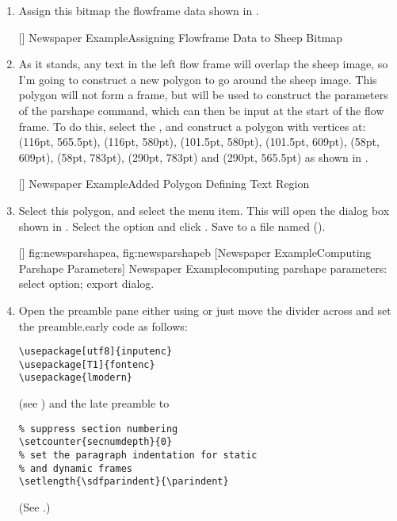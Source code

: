 \begin{enumerate}
[]
{}
{Newspaper Example\dash Added Sheep Bitmap}

\item Assign this \gls{bitmap} the \gls{flowframe} data shown in
.

[]
{}
{Newspaper Example\dash Assigning Flowframe Data to Sheep
Bitmap}

\item As it stands, any text in the left flow frame will overlap
the sheep image, so I'm going to construct a new polygon to go
around the sheep image. This polygon will not form a frame, but
will be used to construct the parameters of the \gls{parshape}
command, which can then be input at the start of the flow frame.
To do this, select the ,
and construct a polygon
with vertices at: (116pt, 565.5pt), (116pt, 580pt), (101.5pt, 580pt),
(101.5pt, 609pt), (58pt, 609pt), (58pt, 783pt), (290pt, 783pt)
and (290pt, 565.5pt) as shown in .

[]
{}
{Newspaper Example\dash Added Polygon Defining Text Region}

\item Select this polygon, and select the  menu
item. This will open the  dialog box shown in
.  Select the
 option and click .  Save to a
file named 
().

[]
{
 {fig:newsparshapea}{}{},
 {fig:newsparshapeb}{}{}
}
[Newspaper Example\dash Computing Parshape Parameters]
{Newspaper Example\dash computing \gls{parshape}
parameters:
 select  option;
 export dialog.}

\item Open the preamble pane either using 
 or just move the divider across and set the
\gls{preamble.early} code as follows:
\begin{verbatim}
\usepackage[utf8]{inputenc}
\usepackage[T1]{fontenc}
\usepackage{lmodern}
\end{verbatim}
(see ) and the late preamble to
\begin{verbatim}
% suppress section numbering
\setcounter{secnumdepth}{0}
% set the paragraph indentation for static
% and dynamic frames
\setlength{\sdfparindent}{\parindent}
\end{verbatim}
(See .)


\end{enumerate}
